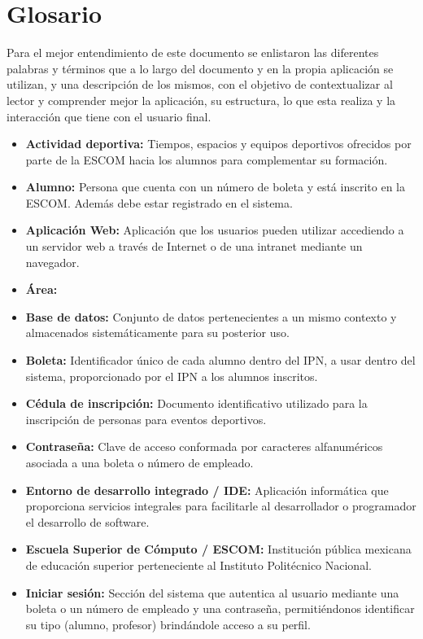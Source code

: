 \chapter{Glosario}
	Para el mejor entendimiento de este documento se enlistaron las diferentes palabras y términos que a lo largo del documento y en la propia aplicación se utilizan, y una descripción de los mismos, con el objetivo de contextualizar al lector y comprender mejor la aplicación, su estructura, lo que esta realiza y la interacción que tiene con el usuario final.
	\begin{itemize}
		\item \textbf{Actividad deportiva:} Tiempos, espacios y equipos deportivos ofrecidos por parte de la ESCOM hacia los alumnos para complementar su formación.
		\item \textbf{Alumno:} Persona que cuenta con un número de boleta y está inscrito en la ESCOM. Además debe estar registrado en el sistema. 
		\item \textbf{Aplicación Web:} Aplicación que los usuarios pueden utilizar accediendo a un servidor web a través de Internet o de una intranet mediante un navegador.
		\item \textbf{Área:}
		\item \textbf{Base de datos:} Conjunto de datos pertenecientes a un mismo contexto y almacenados sistemáticamente para su posterior uso. 
		\item \textbf{Boleta:} Identificador único de cada alumno dentro del IPN, a usar dentro del sistema, proporcionado por el IPN a los alumnos inscritos. 
		\item \textbf{Cédula de inscripción:} Documento identificativo utilizado para la inscripción de personas para eventos deportivos.
		\item \textbf{Contraseña:} Clave de acceso conformada por caracteres alfanuméricos asociada a una boleta o número de empleado.
		\item \textbf{Entorno de desarrollo integrado / IDE:} Aplicación informática que proporciona servicios integrales para facilitarle al desarrollador o programador el desarrollo de software. 
		\item \textbf{Escuela Superior de Cómputo / ESCOM:}  Institución pública mexicana de educación superior perteneciente al Instituto Politécnico Nacional. 
		\item \textbf{Iniciar sesión:} Sección del sistema que autentica al usuario mediante una boleta o un número de empleado y una contraseña, permitiéndonos identificar su tipo (alumno, profesor) brindándole acceso a su perfil. 

\end{itemize}
